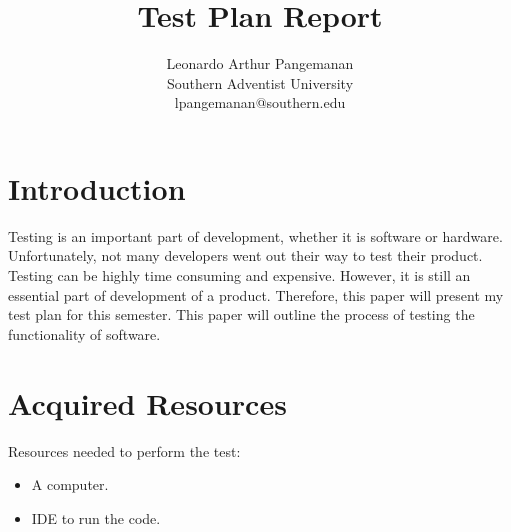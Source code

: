 \documentclass[pdf,bookmarks,colorlinks=true]{article}
\title{Test Plan Report}
\author{Leonardo Arthur Pangemanan\\
	Southern Adventist University\\
	lpangemanan@southern.edu
}
\begin{document}
	\maketitle
	
	\section{Introduction}
		Testing is an important part of development, whether it is software or hardware. Unfortunately, not many developers went out their way to test their product. Testing can be highly time consuming and expensive. However, it is still an essential part of development of a product. Therefore, this paper will present my test plan for this semester. This paper will outline the process of testing the functionality of software.
	\section{Acquired Resources}
		Resources needed to perform the test:
			\begin{itemize}
				\item A computer.
				\item IDE to run the code.
			\end{itemize}
	
	
\end{document}
